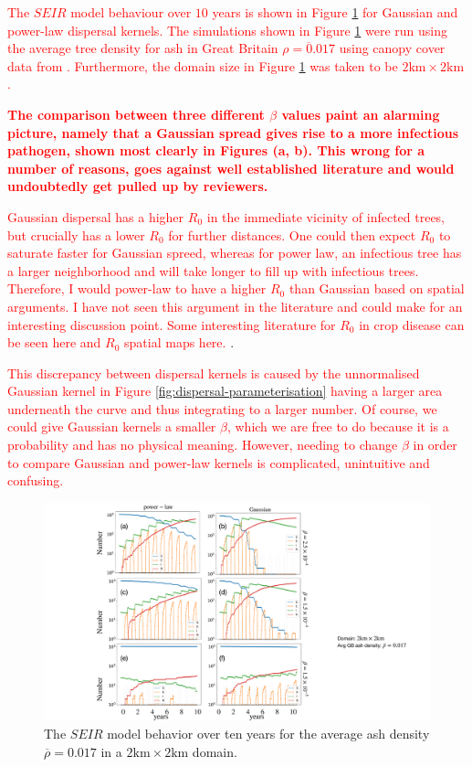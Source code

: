 \textcolor{red}{
The $SEIR$ model behaviour over $10$ years is shown in Figure \ref{fig:SEIR-spread} for Gaussian and power-law dispersal kernels. The simulations shown in Figure \ref{fig:SEIR-spread} were run using the average tree density for ash in Great Britain $\overline{\rho = 0.017}$ using canopy cover data from \cite{hill.data}. Furthermore, the domain size in Figure \ref{fig:SEIR-spread} was taken to be $2\mathrm{km}\times2\mathrm{km}$.}

\textbf{
\textcolor{red}{
The comparison between three different $\beta$ values paint an alarming picture, namely that a Gaussian spread gives rise to a more infectious pathogen, shown most clearly in Figures (a, b). This wrong for a number of reasons, goes against well established literature \cite{WEBIDEMICS} and would undoubtedly get pulled up by reviewers.}}

\textcolor{red}{
Gaussian dispersal has a higher $R_0$ in the immediate vicinity of infected trees, but crucially has a lower $R_0$ for further distances. One could then expect $R_0$ to saturate faster for Gaussian spreed, whereas for power law, an infectious tree has a larger neighborhood and will take longer to fill up with infectious trees. Therefore, I would power-law to have a higher $R_0$ than Gaussian based on spatial arguments. I have not seen this argument in the literature and could make for an interesting discussion point. Some interesting literature for $R_0$ in crop disease can be seen here \cite{mikaberidze2016invasiveness} and $R_0$ spatial maps here.}
\cite{R0-perc-ref}.

\textcolor{red}{This discrepancy between dispersal kernels is caused by the unnormalised Gaussian kernel in Figure \ref{fig:dispersal-parameterisation} having a larger area underneath the curve and thus integrating to a larger number. Of course, we could give Gaussian kernels a smaller $\beta$, which we are free to do because it is a probability and has no physical meaning. However, needing to change $\beta$ in order to compare Gaussian and power-law kernels is complicated, unintuitive and confusing.}

\begin{figure}
    \centering
    \includegraphics[scale=0.35]{chapter6/figures/fig4-seir-2.pdf}
    \caption{The $SEIR$ model behavior over ten years for the average ash density $\overline{\rho} = 0.017$ in a $2 \mathrm{km}\times 2\mathrm{km}$ domain.}
    \label{fig:SEIR-spread}
\end{figure}



